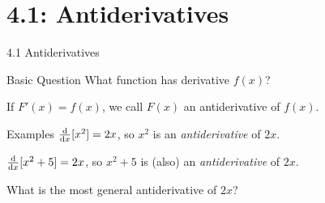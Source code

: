 

\section*{4.1: Antiderivatives}

\begin{frame}
\centering\Large
4.1 Antiderivatives
\end{frame}
\begin{frame}[t]
\AnswerSpace
{}
\begin{block}
{Basic Question}
What function has derivative $f(x)$?
\end{block}
\pause\vfill

If $F'(x)=f(x)$, we call $F(x)$ an \textcolor{M4}{antiderivative} of $f(x)$.\pause\vfill

\begin{block}
{Examples}
$\frac{\text{d}}{\text{d}x}[x^2]=2x$, so $x^2$ is an \emph{antiderivative} of $2x$.
\vspace{5mm}

$\frac{\text{d}}{\text{d}x}[x^2+5]=2x$, so $x^2+5$ is (also) an \emph{antiderivative} of $2x$.
\end{block}
\pause\vfill

What is the most general antiderivative of $2x$? \\\color{answercolor}
\pause {}
\end{frame}

